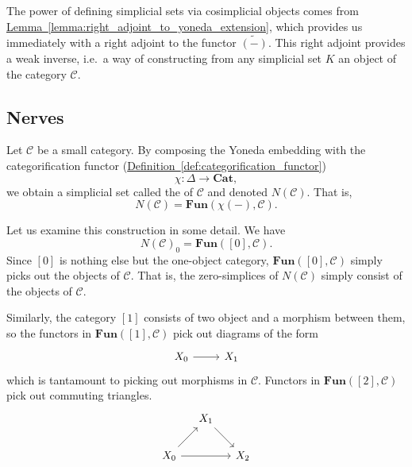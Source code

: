 \documentclass[main.tex]{subfiles}
\begin{document}
The power of defining simplicial sets via cosimplicial objects comes from \hyperref[lemma:right_adjoint_to_yoneda_extension]{Lemma~\ref*{lemma:right_adjoint_to_yoneda_extension}}, which provides us immediately with a right adjoint to the functor $\widetilde{(-)}$. This right adjoint provides a weak inverse, i.e.\ a way of constructing from any simplicial set $K$ an object of the category $\mathcal{C}$.

\subsection{Nerves}
\label{ssc:nerves}

\begin{definition}
  \label{def:nerve_of_a_category}
  Let $\mathcal{C}$ be a small category. By composing the Yoneda embedding with the categorification functor (\hyperref[def:categorification_functor]{Definition~\ref*{def:categorification_functor}})
  \begin{equation*}
    \chi\colon \Delta \to \mathbf{Cat},
  \end{equation*}
  we obtain a simplicial set called the  of $\mathcal{C}$ and denoted $N(\mathcal{C})$. That is,
  \begin{equation*}
    N(\mathcal{C}) = \mathbf{Fun}(\chi(-), \mathcal{C}).
  \end{equation*}
\end{definition}

Let us examine this construction in some detail. We have
\begin{equation*}
  N(\mathcal{C})_{0} = \mathbf{Fun}([0], \mathcal{C}).
\end{equation*}
Since $[0]$ is nothing else but the one-object category, $\mathbf{Fun}([0], \mathcal{C})$ simply picks out the objects of $\mathcal{C}$. That is, the zero-simplices of $N(\mathcal{C})$ simply consist of the objects of $\mathcal{C}$.

Similarly, the category $[1]$ consists of two object and a morphism between them, so the functors in $\mathbf{Fun}([1], \mathcal{C})$ pick out diagrams of the form
\begin{equation*}
  \begin{tikzcd}
    X_{0}
    \arrow[r]
    & X_{1}
  \end{tikzcd}
\end{equation*}
which is tantamount to picking out morphisms in $\mathcal{C}$. Functors in $\mathbf{Fun}([2], \mathcal{C})$ pick out commuting triangles.
\begin{equation*}
  \begin{tikzcd}[column sep=small]
    & X_{1}
    \arrow[dr]
    \\
    X_{0}
    \arrow[rr]
    \arrow[ur]
    && X_{2}
  \end{tikzcd}
\end{equation*}
\end{document}

